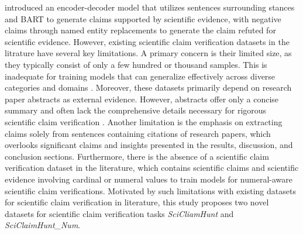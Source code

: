 introduced an encoder-decoder model that utilizes sentences surrounding stances and BART to generate claims supported by scientific evidence, with negative claims through named entity replacements to generate the claim refuted for scientific evidence. However, existing scientific claim verification datasets in the litrature have several key limitations. A primary concern is their limited size, as they typically consist of only a few hundred or thousand samples. This is inadequate for training models that can generalize effectively across diverse categories and domains \cite{vladika2023scientific}. Moreover, these datasets primarily depend on research paper abstracts as external evidence. However, abstracts offer only a concise summary and often lack the comprehensive details necessary for rigorous scientific claim verification \cite{vladika2023scientific}. Another limitation is the emphasis on extracting claims solely from sentences containing citations of research papers, which overlooks significant claims and insights presented in the results, discussion, and conclusion sections. Furthermore, there is the absence of a scientific claim verification dataset in the literature, which contains scientific claims and scientific evidence involving cardinal or numeral values to train models for numeral-aware scientific claim verifications. Motivated by such limitations with existing datasets for scientific claim verification in literature, this study proposes two novel datasets for scientific claim verification tasks \textit{SciCliamHunt} and \textit{ SciClaimHunt\_Num}.












